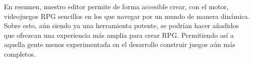 \medskip 

En resumen, nuestro editor permite de forma accesible crear, con el motor, videojuegos RPG sencillos en los que navegar por un mundo de manera dinámica. Sobre esto, aún siendo ya una herramienta potente, se podrían hacer añadidos que ofrezcan una experiencia más amplia para crear RPG. Permitiendo así a aquella gente menos experimentada en el desarrollo construir juegos aún más completos.